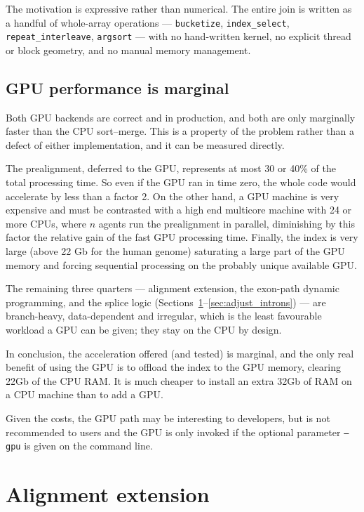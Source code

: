 \documentclass[11pt]{article}
\begin{document}
The motivation is expressive rather than numerical.
The entire join is written as a handful of whole-array operations ---
\texttt{bucketize}, \texttt{index\_select}, \texttt{repeat\_interleave},
\texttt{argsort} --- with no hand-written kernel, no explicit thread or
block geometry, and no manual memory management.

\subsection{GPU performance is marginal}
Both GPU backends are correct and in production, and both are only
marginally faster than the CPU sort--merge.
This is a property of the problem rather than a defect of either
implementation, and it can be measured directly.

The prealignment, deferred to the GPU, represents at most 30 or 40\%
of the total processing time. So even if the GPU ran in time zero, the whole code would accelerate by less than a factor 2.
On the other hand, a GPU machine is very expensive and must be
contrasted with a high end multicore machine with 24 or more CPUs,
where $n$ agents run the prealignment in parallel,
diminishing by this factor the relative gain of the fast GPU processing
time. Finally, the index is very large (above 22 Gb for the human genome)
saturating a large part of the GPU memory and forcing sequential
processing on the probably unique available GPU.

The remaining three quarters --- alignment extension, the exon-path
dynamic programming, and the splice logic
(Sections~\ref{sec:align}--\ref{sec:adjust_introns}) --- are
branch-heavy, data-dependent and irregular, which is the least
favourable workload a GPU can be given; they stay on the CPU by design.

In conclusion, the acceleration offered (and tested) is marginal,
and the only real benefit of using the GPU is to offload the
index to the GPU memory, clearing 22Gb of the CPU RAM.
It is much cheaper to install an extra 32Gb of RAM on a CPU machine
than to add a GPU.

Given the costs, the GPU path may be interesting to developers, but
is not recommended to users and the GPU is only invoked if the
optional parameter \texttt{--gpu}
is given on the command line.

\section {Alignment extension}
\label{sec:align}
\end{document}

